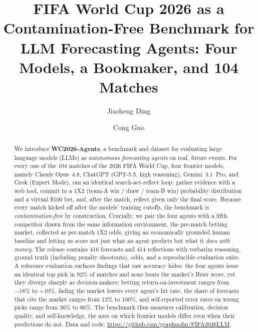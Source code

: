 \documentclass[sigconf,review]{acmart}
\begin{document}
\title{FIFA World Cup 2026 as a Contamination-Free Benchmark for LLM
Forecasting Agents: Four Models, a Bookmaker, and 104 Matches}

\author{Jiacheng Ding}

\author{Cong Guo}
\authornotemark[1]

\renewcommand{\shortauthors}{Ding and Guo}

\begin{abstract}
We introduce \textbf{WC2026-Agents}, a benchmark and dataset for evaluating
large language models (LLMs) as \emph{autonomous forecasting agents} on real,
future events. For every one of the 104 matches of the 2026 FIFA World Cup, four
frontier models, namely Claude Opus~4.8, ChatGPT (GPT-5.5, high reasoning),
Gemini~3.1~Pro, and Grok (Expert Mode), ran an identical search-act-reflect
loop: gather evidence with a web tool, commit to a 1X2 (team-A win / draw /
team-B win) probability distribution and
a virtual \$100 bet, and, after the match, reflect given only the final score.
Because every match kicked off after the models' training cutoffs, the benchmark
is \emph{contamination-free} by construction. Crucially, we pair the four agents
with a fifth competitor drawn from the same information environment, the
pre-match betting market, collected as per-match 1X2 odds, giving an
economically grounded human baseline and letting us score not just what an agent
predicts but what it \emph{does with money}. The release contains 416 forecasts
and 414 reflections with verbatim reasoning, ground truth (including penalty
shootouts), odds, and a reproducible evaluation suite. A reference evaluation
surfaces findings that raw accuracy hides: the four agents issue an identical
top pick in 92\% of matches and none beats the market's Brier score, yet they
diverge sharply as decision-makers: betting return-on-investment ranges from
$-18\%$ to $+10\%$, fading the market lowers every agent's hit rate, the share of
forecasts that cite the market ranges from 12\% to 100\%, and self-reported
error rates on wrong picks range from 36\% to 86\%. The benchmark thus measures
calibration, decision quality, and self-knowledge, the axes on which frontier
models differ even when their predictions do not. Data and code:
\url{https://github.com/graphuofm/FIFA2026LLM}.
\end{abstract}
\end{document}
